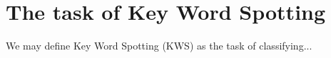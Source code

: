 \section{The task of Key Word Spotting}

We may define Key Word Spotting (KWS) as the task of classifying...